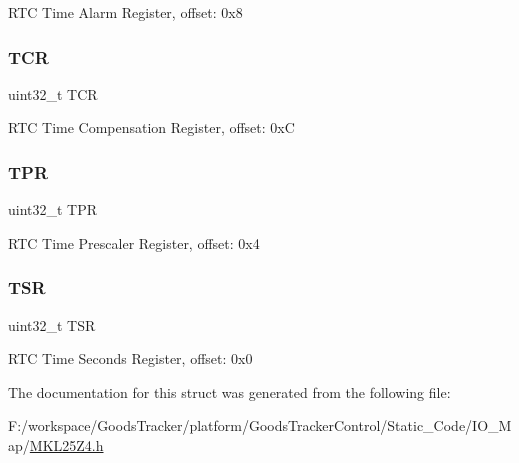 R\+TC Time Alarm Register, offset\+: 0x8 \mbox{\label{struct_r_t_c___mem_map_a9a53e49441f15ba5815fbffc87f2819f}} 
\subsubsection{\texorpdfstring{T\+CR}{TCR}}
{\footnotesize\ttfamily uint32\+\_\+t T\+CR}

R\+TC Time Compensation Register, offset\+: 0xC \mbox{\label{struct_r_t_c___mem_map_afbf8ee068cab47ab0b25805c5b7ef91c}} 
\subsubsection{\texorpdfstring{T\+PR}{TPR}}
{\footnotesize\ttfamily uint32\+\_\+t T\+PR}

R\+TC Time Prescaler Register, offset\+: 0x4 \mbox{\label{struct_r_t_c___mem_map_a57e02b30db8442e215456ffebf82326a}} 
\subsubsection{\texorpdfstring{T\+SR}{TSR}}
{\footnotesize\ttfamily uint32\+\_\+t T\+SR}

R\+TC Time Seconds Register, offset\+: 0x0 

The documentation for this struct was generated from the following file\+:\begin{DoxyCompactItemize}
\item 
F\+:/workspace/\+Goods\+Tracker/platform/\+Goods\+Tracker\+Control/\+Static\+\_\+\+Code/\+I\+O\+\_\+\+Map/\hyperlink{_m_k_l25_z4_8h}{M\+K\+L25\+Z4.\+h}\end{DoxyCompactItemize}

